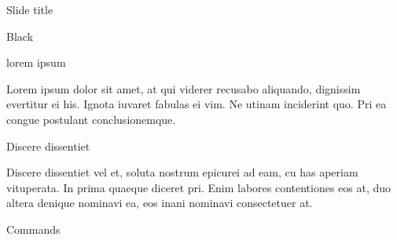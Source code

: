 \documentclass{MichiganTech}
\begin{document}
%
\begin{frame}{Slide title}
  \vspace*{0.10in}
  \begin{reference}{4mm}{84mm}{Black}
    \;
  \end{reference}

  \begin{beamerboxesrounded}[upper=definitionboxhead,lower=definitionboxbody,shadow=true]{lorem ipsum}
    \begin{flushleft}
      Lorem ipsum dolor sit amet, at qui viderer recusabo aliquando, dignissim
      evertitur ei his. Ignota iuvaret fabulas ei vim. Ne utinam inciderint quo.
      Pri ea congue postulant conclusionemque.
    \end{flushleft}
  \end{beamerboxesrounded}

  \pause
  \vspace*{0.10in}
  \begin{beamerboxesrounded}[upper=questionboxhead,lower=questionboxbody,shadow=true]{Discere dissentiet}
    \begin{flushleft}
      Discere dissentiet vel et, soluta nostrum epicurei ad eam, cu has aperiam
      vituperata. In prima quaeque diceret pri. Enim labores contentiones eos 
      at, duo altera denique nominavi ea, eos inani nominavi consectetuer at.
    \end{flushleft}
  \end{beamerboxesrounded}

  \pause
  \vspace*{0.10in}
  \begin{beamerboxesrounded}[upper=commandboxhead,lower=commandboxbody,shadow=true]{Commands}
    \begin{flushleft}
      \\
    \end{flushleft}
  \end{beamerboxesrounded}
\end{frame}
\end{document}
